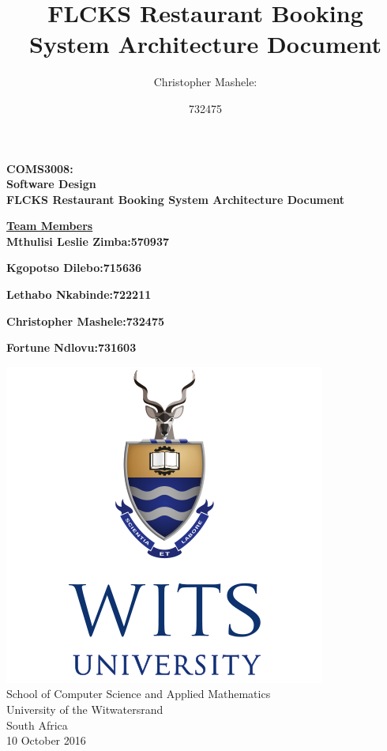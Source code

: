 \documentclass{article}
\title{FLCKS Restaurant Booking System Architecture Document }
\author{
	Christopher Mashele:\\
	\and
	732475\\
	}
\begin{document}
\begin{titlepage}
	
		\hspace{0.5cm}
		\huge
		\center
		\textbf{COMS3008:\\ Software Design}\\

		\vspace*{1cm}
		\Large
		\hspace{2cm}
		\center
		\textbf{FLCKS Restaurant Booking System Architecture Document}
		\vspace*{2cm}
		\normalsize
		\hspace{2.5cm}

		\textbf{\underline{Team Members}}\\

		\textbf{Mthulisi Leslie Zimba:\hfill570937}

		\textbf{Kgopotso Dilebo:\hfill 715636}

		\textbf{Lethabo Nkabinde:\hfill 722211}

		\textbf{Christopher Mashele:\hfill 732475}
		
		\textbf{Fortune Ndlovu:\hfill 731603}

		
		\vspace{2cm}
		\normalsize
		\hspace{4cm}
		\includegraphics[scale=0.3]{logo}\\
		\hspace{3cm} School of Computer Science and Applied Mathematics\\
		\hspace{3cm}University of the Witwatersrand\\
		\hspace{3cm} South Africa\\
		\hspace{3cm}  10 October 2016 \\
	
\end{titlepage}
\end{document}
